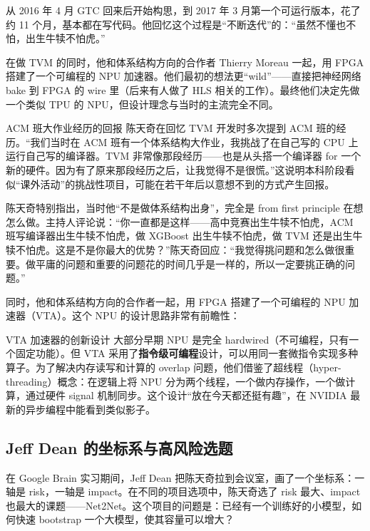 从 2016 年 4 月 GTC 回来后开始构思，到 2017 年 3 月第一个可运行版本，花了约 11 个月，基本都在写代码。他回忆这个过程是``不断迭代''的：``虽然不懂也不怕，出生牛犊不怕虎。''

在做 TVM 的同时，他和体系结构方向的合作者 Thierry Moreau 一起，用 FPGA 搭建了一个可编程的 NPU 加速器。他们最初的想法更``wild''------直接把神经网络 bake 到 FPGA 的 wire 里（后来有人做了 HLS 相关的工作）。最终他们决定先做一个类似 TPU 的 NPU，但设计理念与当时的主流完全不同。

\begin{warningbox}{ACM 班大作业经历的回报}
陈天奇在回忆 TVM 开发时多次提到 ACM 班的经历。``我们当时在 ACM 班有一个体系结构大作业，我挑战了在自己写的 CPU 上运行自己写的编译器。TVM 非常像那段经历------也是从头搭一个编译器 for 一个新的硬件。因为有了原来那段经历之后，让我觉得不是很慌。''这说明本科阶段看似``课外活动''的挑战性项目，可能在若干年后以意想不到的方式产生回报。
\end{warningbox}

陈天奇特别指出，当时他``不是做体系结构出身''，完全是 from first principle 在想怎么做。主持人评论说：``你一直都是这样------高中竞赛出生牛犊不怕虎，ACM 班写编译器出生牛犊不怕虎，做 XGBoost 出生牛犊不怕虎，做 TVM 还是出生牛犊不怕虎。这是不是你最大的优势？''陈天奇回应：``我觉得挑问题和怎么做很重要。做平庸的问题和重要的问题花的时间几乎是一样的，所以一定要挑正确的问题。''

同时，他和体系结构方向的合作者一起，用 FPGA 搭建了一个可编程的 NPU 加速器（VTA）。这个 NPU 的设计思路非常有前瞻性：

\begin{knowledgebox}{VTA 加速器的创新设计}
大部分早期 NPU 是完全 hardwired（不可编程，只有一个固定功能）。但 VTA 采用了\textbf{指令级可编程}设计，可以用同一套微指令实现多种算子。为了解决内存读写和计算的 overlap 问题，他们借鉴了超线程（hyper-threading）概念：在逻辑上将 NPU 分为两个线程，一个做内存操作，一个做计算，通过硬件 signal 机制同步。这个设计``放在今天都还挺有趣''，在 NVIDIA 最新的异步编程中能看到类似影子。
\end{knowledgebox}

\subsection{Jeff Dean 的坐标系与高风险选题}

在 Google Brain 实习期间，Jeff Dean 把陈天奇拉到会议室，画了一个坐标系：一轴是 risk，一轴是 impact。在不同的项目选项中，陈天奇选了 risk 最大、impact 也最大的课题------Net2Net。这个项目的问题是：已经有一个训练好的小模型，如何快速 bootstrap 一个大模型，使其容量可以增大？


